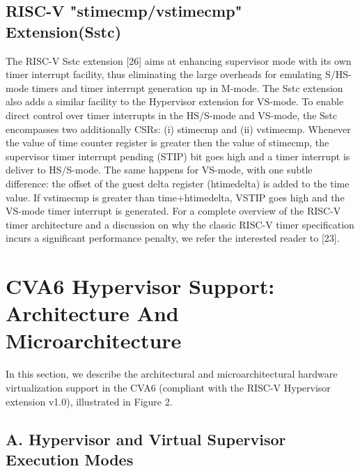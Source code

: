 \subsection*{RISC-V "stimecmp/vstimecmp" Extension(Sstc)}

The RISC-V Sstc extension [26] aims at enhancing supervisor mode with its own timer interrupt facility, thus eliminating
the large overheads for emulating S/HS-mode timers and
timer interrupt generation up in M-mode. The Sstc extension
also adds a similar facility to the Hypervisor extension for
VS-mode. To enable direct control over timer interrupts in the HS/S-mode and VS-mode, the Sstc encompasses two
additionally CSRs: (i) stimecmp and (ii) vstimecmp. Whenever
the value of time counter register is greater then the value
of stimecmp, the supervisor timer interrupt pending (STIP)
bit goes high and a timer interrupt is deliver to HS/S-mode.
The same happens for VS-mode, with one subtle difference:
the offset of the guest delta register (htimedelta) is added to
the time value. If vstimecmp is greater than time+htimedelta,
VSTIP goes high and the VS-mode timer interrupt is generated.
For a complete overview of the RISC-V timer architecture and
a discussion on why the classic RISC-V timer specification incurs a significant performance penalty, we refer the interested
reader to [23].

\section*{CVA6 Hypervisor Support: Architecture And Microarchitecture}

In this section, we describe the architectural and microarchitectural hardware virtualization support in the CVA6 (compliant with the RISC-V Hypervisor extension v1.0), illustrated
in Figure 2.

\subsection*{A. Hypervisor and Virtual Supervisor Execution Modes}

